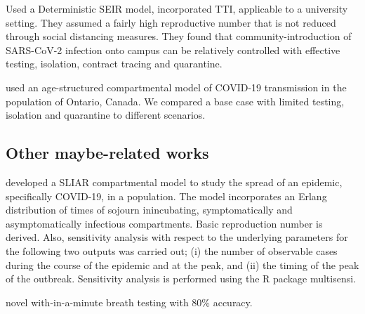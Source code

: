 \documentclass{article}\usepackage[]{graphicx}\usepackage[]{color}
\begin{document}
\citep{lopman2020model} Used a Deterministic SEIR model, incorporated TTI, applicable to a university setting. They assumed a fairly high reproductive number that is not reduced through social
distancing measures. They found that community-introduction of SARS-CoV-2 infection onto campus can be
relatively controlled with effective testing, isolation, contract tracing and quarantine.

\citep{tuite2020mathematical} used an age-structured compartmental model of COVID-19 transmission in the population of Ontario, Canada. We compared a base case with limited testing, isolation and quarantine to different scenarios. 




\subsection{Other maybe-related works}
\citep{arino2020simple} developed a SLIAR compartmental model to study the spread of an epidemic, specifically COVID-19, in a population. The model incorporates an Erlang distribution of times of sojourn inincubating, symptomatically and asymptomatically infectious compartments. Basic reproduction number is derived. Also, sensitivity analysis with respect to the underlying parameters for the following two outputs was carried out; (i) the number of observable cases during the course of the epidemic and at the peak, and (ii) the timing of the peak of the outbreak. Sensitivity analysis is performed using the R package multisensi.

\citep{ruszkiewicz2020diagnosis} novel with-in-a-minute breath testing with 80\% accuracy. 

\end{document}
